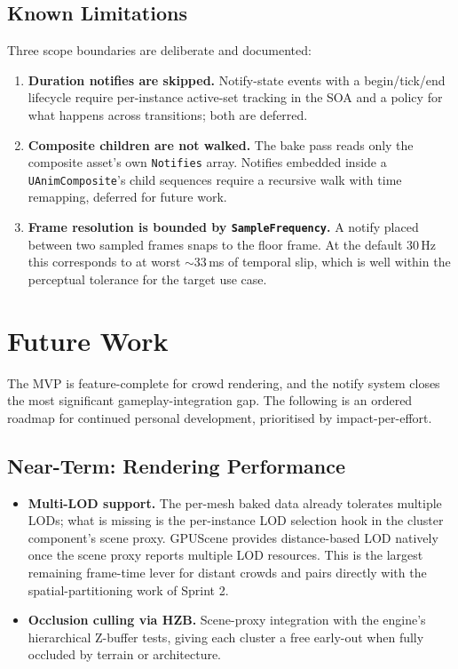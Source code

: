 \documentclass[11pt, a4paper]{article}
\begin{document}
\subsection{Known Limitations}

Three scope boundaries are deliberate and documented:

\begin{enumerate}[leftmargin=1.5em]
    \item \textbf{Duration notifies are skipped.} Notify-state events with a begin/tick/end lifecycle require per-instance active-set tracking in the SOA and a policy for what happens across transitions; both are deferred.
    \item \textbf{Composite children are not walked.} The bake pass reads only the composite asset's own \texttt{Notifies} array. Notifies embedded inside a \texttt{UAnimComposite}'s child sequences require a recursive walk with time remapping, deferred for future work.
    \item \textbf{Frame resolution is bounded by \texttt{SampleFrequency}.} A notify placed between two sampled frames snaps to the floor frame. At the default 30\,Hz this corresponds to at worst $\sim$33\,ms of temporal slip, which is well within the perceptual tolerance for the target use case.
\end{enumerate}

\section{Future Work}

The MVP is feature-complete for crowd rendering, and the notify system closes the most significant gameplay-integration gap. The following is an ordered roadmap for continued personal development, prioritised by impact-per-effort.

\subsection{Near-Term: Rendering Performance}

\begin{itemize}[leftmargin=1.5em]
    \item \textbf{Multi-LOD support.} The per-mesh baked data already tolerates multiple LODs; what is missing is the per-instance LOD selection hook in the cluster component's scene proxy. GPUScene provides distance-based LOD natively once the scene proxy reports multiple LOD resources. This is the largest remaining frame-time lever for distant crowds and pairs directly with the spatial-partitioning work of Sprint 2.
    \item \textbf{Occlusion culling via HZB.} Scene-proxy integration with the engine's hierarchical Z-buffer tests, giving each cluster a free early-out when fully occluded by terrain or architecture.
\end{itemize}
\end{document}
